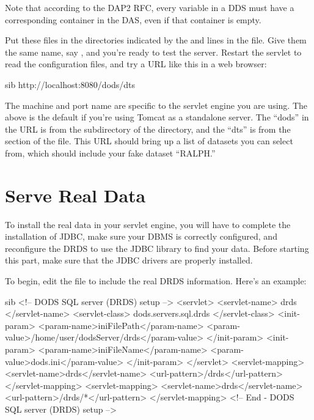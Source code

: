 \documentclass{dods-book}
\begin{document}
Note that according to the DAP2 RFC, every variable in a DDS must have
a corresponding container in the DAS, even if that container is empty.

Put these files in the directories indicated by the 
and  lines in the  file.  Give them
the same name, say , and you're
ready to test the server.  Restart the servlet to read the
configuration files, and try a URL like this in a web browser:

\begin{vcode}{sib}
http://localhost:8080/dods/dts
\end{vcode}

The machine and port name are specific to the servlet engine you are
using.  The above is the default if you're using Tomcat as a
standalone server.  The ``dods'' in the URL is from the subdirectory
of the  directory, and the ``dts'' is from the
 section of the  file.  This URL
should bring up a list of datasets you can select from, which should
include your fake dataset ``RALPH.''

\section{Serve Real Data}
\label{server,drds,real-data}

To install the real data in your servlet engine, you will have to
complete the installation of JDBC, make sure your DBMS is correctly
configured, and reconfigure the DRDS to use the JDBC library to find
your data.  Before starting this part, make sure that the JDBC drivers
are properly installed.

To begin, edit the  file to include the real DRDS
information.  Here's an example:

\begin{vcode}{sib}
<!-- DODS SQL server (DRDS) setup -->
<servlet>
    <servlet-name>
        drds
    </servlet-name>
    <servlet-class>
        dods.servers.sql.drds
    </servlet-class>
    <init-param>
        <param-name>iniFilePath</param-name>
        <param-value>/home/user/dodsServer/drds</param-value>
    </init-param>
    <init-param>
        <param-name>iniFileName</param-name>
        <param-value>dods.ini</param-value>
    </init-param>
</servlet>
<servlet-mapping>
    <servlet-name>drds</servlet-name>
    <url-pattern>/drds</url-pattern>
</servlet-mapping>
<servlet-mapping>
    <servlet-name>drds</servlet-name>
    <url-pattern>/drds/*</url-pattern>
</servlet-mapping>
<!-- End - DODS SQL server (DRDS) setup -->
\end{vcode}
\end{document}
